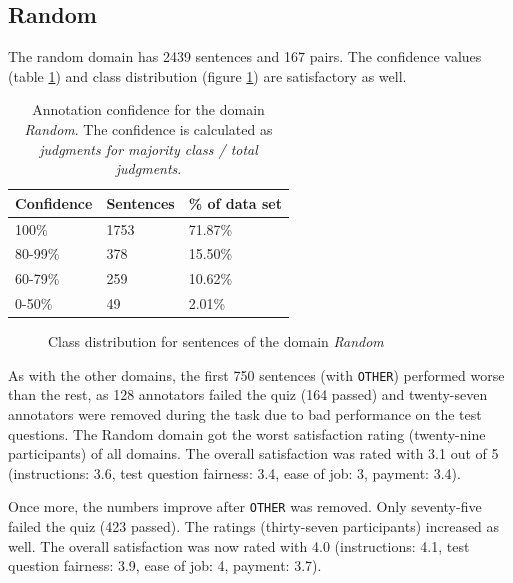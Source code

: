 \subsection{Random}
The random domain has 2439 sentences and 167 pairs. The confidence values (table \ref{fig:random_agg}) and class distribution (figure \ref{fig:random_fin}) are satisfactory as well.
\begin{table}[h]
\caption{Annotation confidence for the domain \emph{Random}. The confidence is calculated as \emph{judgments for majority class / total judgments}.}
\label{fig:random_agg}
\begin{tabularx}{\textwidth}{XXX}
\toprule
Confidence & Sentences & \% of data set \\
\midrule
100\%	&	1753	&	71.87\%	 \\ 
80-99\%	&	378	&	15.50\%	 \\ 
60-79\%	&	259	&	10.62\%	 \\ 
0-50\%	&	49	&	2.01\%	 \\ 
\bottomrule
\end{tabularx}
\end{table}

\begin{figure}[h]
\centering
\caption{Class distribution for sentences of the domain \emph{Random}}
\label{fig:random_fin}
\end{figure}

As with the other domains, the first 750 sentences (with \texttt{OTHER}) performed worse than the rest, as 128 annotators failed the quiz (164 passed) and twenty-seven annotators were removed during the task due to bad performance on the test questions. The Random domain got the worst satisfaction rating (twenty-nine participants) of all domains. The overall satisfaction was rated with 3.1 out of 5 (instructions: 3.6, test question fairness: 3.4, ease of job: 3, payment: 3.4).

Once more, the numbers improve after \texttt{OTHER} was removed. Only seventy-five failed the quiz (423 passed). The ratings (thirty-seven participants) increased as well. The overall satisfaction was now rated with 4.0 (instructions: 4.1, test question fairness: 3.9, ease of job: 4, payment: 3.7).


